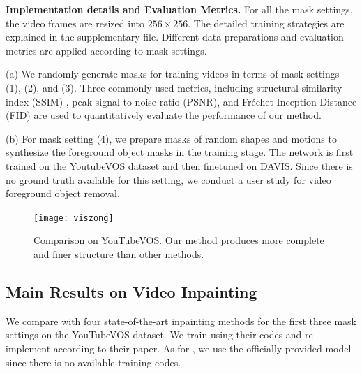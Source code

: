 \noindent \textbf{Implementation details and Evaluation Metrics.} 
For all the mask settings, the video frames are resized into $256\times256$. The detailed training strategies are explained in the supplementary file. 
Different data preparations and evaluation metrics are applied according to mask settings.

\noindent (a) We randomly generate masks for training videos in terms of mask settings (1), (2), and (3).  
Three commonly-used metrics, including structural similarity index (SSIM) \cite{wang2004image}, peak signal-to-noise ratio (PSNR), and Fr{\'e}chet Inception Distance (FID) \cite{heusel2017gans} are used to quantitatively evaluate the performance of our method. 

\noindent (b) For mask setting (4), we prepare masks of random shapes and motions to synthesize the foreground object masks in the training stage. The network is first trained on the YoutubeVOS dataset and then finetuned on DAVIS. Since there is no ground truth available for this setting, we conduct a user study for video foreground object removal.  

 
 
  

 
\begin{figure}[t]
	\centering
	\texttt{[image: viszong]} %
	\caption{Comparison on YouTubeVOS.  Our method produces more complete and finer structure than other methods.  }
	\label{viszong}
\end{figure}


\subsection{Main Results on Video Inpainting}

We compare with four state-of-the-art inpainting methods for the first three mask settings on the YouTubeVOS dataset. %
%
We train \cite{nazeri2019edgeconnect,Xu_2019_CVPR} using their codes and re-implement \cite{wang2019video} according to their paper. As for \cite{Kim_2019_CVPR1}, we use the officially provided model since there is no available training codes.

